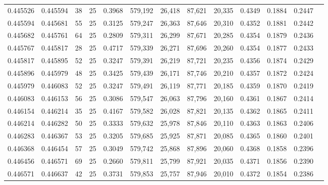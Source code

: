 \begin{tabular}{rrrrrrrrrrrrr}
0.445526 & 0.445594 &    38 &  25 &                                     0.3968 & 579,192 &  26,418 &  87,621 &  20,335 & 0.4349 & 0.1884 & 0.2447 \\
0.445594 & 0.445681 &    55 &  25 &                                     0.3125 & 579,247 &  26,363 &  87,646 &  20,310 & 0.4352 & 0.1881 & 0.2442 \\
0.445682 & 0.445761 &    64 &  25 &                                     0.2809 & 579,311 &  26,299 &  87,671 &  20,285 & 0.4354 & 0.1879 & 0.2436 \\
0.445767 & 0.445817 &    28 &  25 &                                     0.4717 & 579,339 &  26,271 &  87,696 &  20,260 & 0.4354 & 0.1877 & 0.2433 \\
0.445817 & 0.445895 &    52 &  25 &                                     0.3247 & 579,391 &  26,219 &  87,721 &  20,235 & 0.4356 & 0.1874 & 0.2429 \\
0.445896 & 0.445979 &    48 &  25 &                                     0.3425 & 579,439 &  26,171 &  87,746 &  20,210 & 0.4357 & 0.1872 & 0.2424 \\
0.445979 & 0.446083 &    52 &  25 &                                     0.3247 & 579,491 &  26,119 &  87,771 &  20,185 & 0.4359 & 0.1870 & 0.2419 \\
0.446083 & 0.446153 &    56 &  25 &                                     0.3086 & 579,547 &  26,063 &  87,796 &  20,160 & 0.4361 & 0.1867 & 0.2414 \\
0.446154 & 0.446214 &    35 &  25 &                                     0.4167 & 579,582 &  26,028 &  87,821 &  20,135 & 0.4362 & 0.1865 & 0.2411 \\
0.446214 & 0.446282 &    50 &  25 &                                     0.3333 & 579,632 &  25,978 &  87,846 &  20,110 & 0.4363 & 0.1863 & 0.2406 \\
0.446283 & 0.446367 &    53 &  25 &                                     0.3205 & 579,685 &  25,925 &  87,871 &  20,085 & 0.4365 & 0.1860 & 0.2401 \\
0.446368 & 0.446454 &    57 &  25 &                                     0.3049 & 579,742 &  25,868 &  87,896 &  20,060 & 0.4368 & 0.1858 & 0.2396 \\
0.446456 & 0.446571 &    69 &  25 &                                     0.2660 & 579,811 &  25,799 &  87,921 &  20,035 & 0.4371 & 0.1856 & 0.2390 \\
0.446571 & 0.446637 &    42 &  25 &                                     0.3731 & 579,853 &  25,757 &  87,946 &  20,010 & 0.4372 & 0.1854 & 0.2386 \\

\end{tabular}

